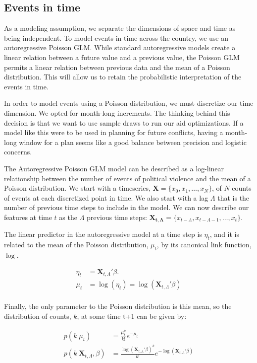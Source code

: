 \documentclass{article} %
\begin{document}
\subsection{Events in time}
As a modeling assumption, we separate the dimensions of space and time as being independent. To model events in time across the country, we use an autoregressive Poisson GLM. While standard autoregressive models create a linear relation between a future value and a previous value, the Poisson GLM permits a linear relation between previous data and the mean of a Poisson distribution. This will allow us to retain the probabilistic interpretation of the events in time.

In order to model events using a Poisson distribution, we must discretize our time dimension. We opted for month-long increments. The thinking behind this decision is that we want to use sample draws to run our aid optimizations. If a model like this were to be used in planning for future conflicts, having a month-long window for a plan seems like a good balance between precision and logistic concerns.

The Autoregressive Poisson GLM model can be described as a log-linear relationship between the number of events of political violence and the mean of a Poisson distribution. We start with a timeseries, $\mathbf{X} = \{x_0, x_1,\hdots, x_N\}$, of $N$ counts of events at each discretized point in time. We also start with a lag $\Lambda$ that is the number of previous time steps to include in the model. We can now describe our features at time $t$ as the $\Lambda$ previous time steps: $\mathbf{X_{t, \Lambda}} = \{x_{t-\Lambda}, x_{t-\Lambda-1},\hdots, x_t\}$.

The linear predictor in the autoregressive model at a time step is $\eta_t$, and it is related to the mean of the Poisson distribution, $\mu_t$, by its canonical link function, $\log$.

\begin{align*}
\eta_t &= \mathbf{X}_{t, \Lambda}'\beta. \\
\mu_t &= \log(\eta_t) = \log(\mathbf{X}_{t, \Lambda}'\beta) \\
\end{align*}

Finally, the only parameter to the Poisson distribution is this mean, so the distribution of counts, $k$, at some time t+1 can be given by:

\begin{align*}
p(k | \mu_t) &= \frac{\mu_t^k}{k!}e^{-\mu_t} \\
p(k | \mathbf{X}_{t, \Lambda}, \beta) &= \frac{\log(\mathbf{X}_{t, \Lambda}'\beta)^k}{k!}e^{-\log(\mathbf{X}_{t, \Lambda}'\beta)} 
\end{align*}
\end{document}
